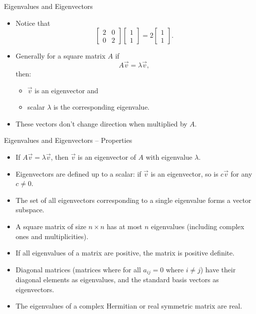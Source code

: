 \documentclass{beamer}
\begin{document}
\begin{frame}{Eigenvalues and Eigenvectors}
  \begin{itemize}
    \item Notice that
    \begin{equation}
        \begin{bmatrix} 2 & 0 \\ 0 & 2 \end{bmatrix}\begin{bmatrix} 1 \\ 1 \end{bmatrix} = 2\begin{bmatrix} 1 \\ 1 \end{bmatrix}.
    \end{equation}
    \item Generally for a square matrix \(A\) if
    \begin{equation}
        A\vec{v} = \lambda \vec{v},
    \end{equation}
    then:
    \begin{itemize}
      \item $\vec{v}$ is an eigenvector and
      \item scalar $\lambda$ is the corresponding eigenvalue.
    \end{itemize}
    \item These vectors don't change direction when multiplied by $A$.
  \end{itemize}
\end{frame}

\begin{frame}{Eigenvalues and Eigenvectors – Properties}
  \begin{itemize}
    \item If $A \vec{v} = \lambda \vec{v}$, then $\vec{v}$ is an eigenvector of $A$ with eigenvalue $\lambda$.
    \item Eigenvectors are defined up to a scalar: if $\vec{v}$ is an eigenvector, so is $c\vec{v}$ for any $c \neq 0$.
    \item The set of all eigenvectors corresponding to a single eigenvalue forms a vector subspace.
    \item A square matrix of size $n \times n$ has at most $n$ eigenvalues (including complex ones and multiplicities).
    \item If all eigenvalues of a matrix are positive, the matrix is positive definite.
    \item Diagonal matrices (matrices where for all $a_{ij}=0$ where $i\neq j$) have their diagonal elements as eigenvalues, and the standard basis vectors as eigenvectors.
    \item The eigenvalues of a complex Hermitian or real symmetric matrix are real.
  \end{itemize}
\end{frame}
\end{document}

